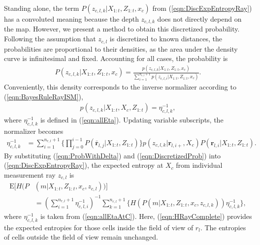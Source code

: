 \documentclass[smallextended]{svjour3}       %
\newcommand{\refeqn}[1]{(\ref{eqn:#1})}
\begin{document}
Standing alone, the term $P(z_{c,l,k}|X_{1:t},Z_{1:t},x_c)$ from \refeqn{DiscExpEntropyRay} has a convoluted meaning because the depth $z_{c,l,k}$ does not directly depend on the map. However, we present a method to obtain this discretized probability. %
Following the assumption that $z_{c,l}$ is discretized to known distances, the probabilities are proportional to their densities, as the area under the density curve is infinitesimal and fixed. Accounting for all cases, the probability is
\begin{align}
\label{eqn:ProbWithDelta}
P(z_{c,l,k}|X_{1:t},Z_{1:t},x_c)=\frac{p(z_{c,l,k}|X_{1:t},Z_{1:t},x_c)}{\sum_{i=1}^{n_{r,l}+1}p(z_{c,l,i}|X_{1:t},Z_{1:t},x_c)}.
\end{align}
Conveniently, this density corresponds to the inverse normalizer according to \refeqn{BayesRuleRayISM},
\begin{align}
\label{eqn:DiscretizedProb}
p(z_{c,l,k}|X_{1:t},X_c,Z_{1:t})=\eta_{c,l,k}^{-1},
\end{align}
where $\eta_{c,l,k}^{-1}$ is defined in \refeqn{allEta}. %
Updating variable subscripts, the normalizer becomes
\begin{align}
\label{eqn:allEtaAtC}
\eta_{c,l,k}^{-1}
&=
\sum_{i=1}^{n_{r,l}+1}\bigg\{\prod_{j=0}^{i-1}P(\bar{\mathbf{r}}_{l,j}|X_{1:t},Z_{1:t})\bigg\}%
p(z_{c,l,k}|\mathbf{r}_{l,i+},X_c)P(\mathbf{r}_{l,i}|X_{1:t},Z_{1:t}).
\end{align}
By substituting \refeqn{ProbWithDelta} and \refeqn{DiscretizedProb} into \refeqn{DiscExpEntropyRay}, the expected entropy at $X_c$ from individual measurement ray $z_{c,l}$ is
\begin{align}
\label{eqn:HRayComplete}
\text{E}[H(P&(m|X_{1:t},Z_{1:t},x_c,z_{c,l}))]\nonumber\\&=
\left(\sum_{i=1}^{n_{r,l}+1}\eta_{c,l,i}^{-1}\right)^{-1}%
\sum_{k=1}^{n_{r,l}+1}\bigg\{H(P(m|X_{1:t},Z_{1:t},x_c,z_{c,l,k}))\eta_{c,l,k}^{-1}\bigg\},
\end{align}
where $\eta_{c,l,k}^{-1}$ is taken from \refeqn{allEtaAtC}.
Here, \refeqn{HRayComplete} provides the expected entropies for those cells inside the field of view of $r_l$. %
The entropies of cells outside the field of view remain unchanged.
\end{document}
